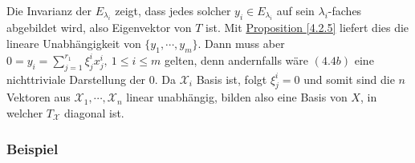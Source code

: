 \begin{itemize}
Die Invarianz der $E_{\lambda _i}$ zeigt, dass jedes solcher $y_i\in E_{\lambda _i}$ auf sein $\lambda _i$-faches abgebildet wird, also Eigenvektor von $T$ ist.  Mit \hyperref[4.2.5]{Proposition \ref{4.2.5}} liefert dies die lineare Unabhängigkeit von $\{y_1,\cdots ,y_m\}$.  Dann muss aber $0=y_i=\sum _{j=1}^{r_1}\xi _j^ix_j^i,\ 1\leq i\leq m$ gelten, denn andernfalls wäre \hyperref[4.4b]{$(4.4b)$} eine nichttriviale Darstellung der $0$.  Da $\mathcal{X}_i$ Basis ist, folgt $\xi _j^i=0$ und somit sind die $n$ Vektoren aus $\mathcal{X}_1,\cdots ,\mathcal{X}_n$ linear unabhängig, bilden also eine Basis von $X$, in welcher $T_\mathcal{X}$ diagonal ist.
\end{itemize}
\subsubsection{Beispiel}
\label{4.4.4}
\numbers
